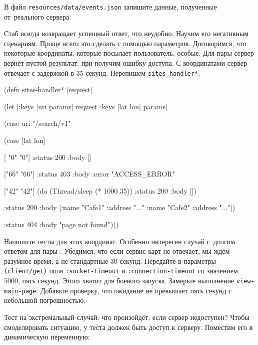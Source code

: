 \noindent
В файл \verb|resources/data/events.json| запишите данные, полученные
от~реального сервера.


Стаб всегда возвращает успешный ответ, что неудобно. Научим его негативным
сценариям. Проще всего это сделать с помощью параметров. Договоримся, что
некоторые координаты, которые посылает пользователь, особые. Для пары 
сервер вернёт пустой результат; при  получим ошибку
доступа. С координатами  сервер отвечает с задержкой в 35
секунд. Перепишем \verb|sites-handler*|:

\begin{english}
  \begin{clojure}
(defn sites-handler* [request]

  (let [{:keys [uri params]} request
        {:keys [lat lon]} params]

    (case uri
      "/search/v1"

      (case [lat lon]

        [ "0"  "0"]
        {:status 200 :body []}

        ["66" "66"]
        {:status 403
         :body {:error "ACCESS_ERROR"}}

        ["42" "42"]
        (do (Thread/sleep (* 1000 35))
            {:status 200 :body []})

        {:status 200
         :body [{:name "Cafe1"
                 :address "..."}
                {:name "Cafe2"
                 :address "..."}]})

      {:status 404
       :body "page not found"})))
  \end{clojure}
\end{english}


Напишите тесты для этих координат. Особенно интересен случай с~долгим ответом
для пары . Убедимся, что если сервис карт не отвечает, мы ждём
разумное время, а не стандартные 30 секунд. Передайте в параметры
\verb|(client/get)| поля \verb|:socket-timeout| и \verb|:connection-timeout| со
значением 5000, пять секунд. Этого хватит для боевого запуска. Замерьте
выполнение \verb|view-main-page|. Добавьте проверку, что ожидание не превышает
пять секунд с небольшой погрешностью.

Тест на экстремальный случай: что произойдёт, если сервер недоступен? Чтобы
смоделировать ситуацию, у теста должен быть доступ к серверу. Поместим его в
динамическую переменную:

